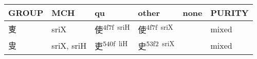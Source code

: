 \documentclass[14pt,a4paper]{scrartcl}
\begin{document}
\begin{longtable}[c]{@{}llllll@{}}
\toprule
\begin{minipage}[b]{0.14\columnwidth}\raggedright\strut
GROUP
\strut\end{minipage} &
\begin{minipage}[b]{0.14\columnwidth}\raggedright\strut
MCH
\strut\end{minipage} &
\begin{minipage}[b]{0.14\columnwidth}\raggedright\strut
qu
\strut\end{minipage} &
\begin{minipage}[b]{0.14\columnwidth}\raggedright\strut
other
\strut\end{minipage} &
\begin{minipage}[b]{0.14\columnwidth}\raggedright\strut
none
\strut\end{minipage} &
\begin{minipage}[b]{0.14\columnwidth}\raggedright\strut
PURITY
\strut\end{minipage}\tabularnewline
\midrule
\endhead
\begin{minipage}[t]{0.14\columnwidth}\raggedright\strut
叓
\strut\end{minipage} &
\begin{minipage}[t]{0.14\columnwidth}\raggedright\strut
sriX
\strut\end{minipage} &
\begin{minipage}[t]{0.14\columnwidth}\raggedright\strut
使\textsuperscript{4f7f~sriH}
\strut\end{minipage} &
\begin{minipage}[t]{0.14\columnwidth}\raggedright\strut
使\textsuperscript{4f7f~sriX}
\strut\end{minipage} &
\begin{minipage}[t]{0.14\columnwidth}\raggedright\strut
\strut\end{minipage} &
\begin{minipage}[t]{0.14\columnwidth}\raggedright\strut
mixed
\strut\end{minipage}\tabularnewline
\begin{minipage}[t]{0.14\columnwidth}\raggedright\strut
㕜
\strut\end{minipage} &
\begin{minipage}[t]{0.14\columnwidth}\raggedright\strut
sriX, sriH
\strut\end{minipage} &
\begin{minipage}[t]{0.14\columnwidth}\raggedright\strut
吏\textsuperscript{540f~liH}
\strut\end{minipage} &
\begin{minipage}[t]{0.14\columnwidth}\raggedright\strut
史\textsuperscript{53f2~sriX}
\strut\end{minipage} &
\begin{minipage}[t]{0.14\columnwidth}\raggedright\strut
\strut\end{minipage} &
\begin{minipage}[t]{0.14\columnwidth}\raggedright\strut
mixed
\strut\end{minipage}\tabularnewline
\bottomrule
\end{longtable}
\end{document}
